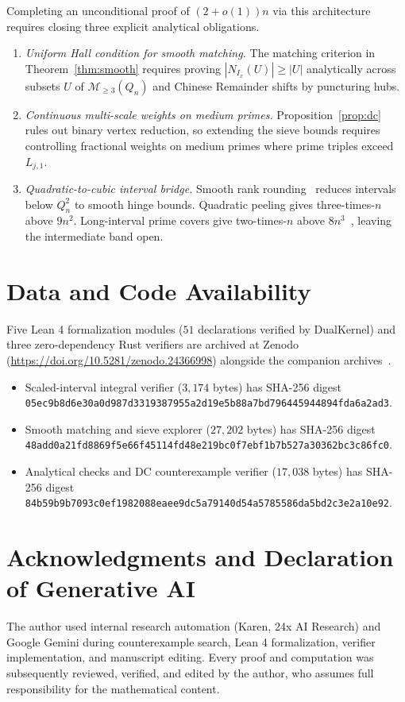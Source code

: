 \documentclass[11pt]{article}
\begin{document}
Completing an unconditional proof of $(2 + o(1)) n$ via this architecture requires closing three explicit analytical obligations.
\begin{enumerate}
\item \emph{Uniform Hall condition for smooth matching.} The matching criterion in Theorem~\ref{thm:smooth} requires proving $|N_{I_x}(U)| \ge |U|$ analytically across subsets $U$ of $\mathcal{M}_{\ge 3}(Q_n)$ and Chinese Remainder shifts by puncturing hubs.
\item \emph{Continuous multi-scale weights on medium primes.} Proposition~\ref{prop:dc} rules out binary vertex reduction, so extending the sieve bounds requires controlling fractional weights on medium primes where prime triples exceed $L_{j, 1}$.
\item \emph{Quadratic-to-cubic interval bridge.} Smooth rank rounding~\cite{bergstrom26asymptotic} reduces intervals below $Q_n^2$ to smooth hinge bounds. Quadratic peeling gives three-times-$n$ above $9n^2$. Long-interval prime covers give two-times-$n$ above $8n^3$~\cite{chen26}, leaving the intermediate band open.
\end{enumerate}

\section*{Data and Code Availability}

Five Lean 4 formalization modules ($51$ declarations verified by DualKernel) and three zero-dependency Rust verifiers are archived at Zenodo~\cite{bergstrom26smoothcode} (\url{https://doi.org/10.5281/zenodo.24366998}) alongside the companion archives~\cite{bergstrom26small,bergstrom26asymptotic}.
\begin{itemize}
\item Scaled-interval integral verifier ($3{,}174$ bytes) has SHA-256 digest {\small \texttt{05ec9b8d6e30a0d987d3319387955a2d19e5b88a7bd796445944894fda6a2ad3}}.
\item Smooth matching and sieve explorer ($27{,}202$ bytes) has SHA-256 digest {\small \texttt{48add0a21fd8869f5e66f45114fd48e219bc0f7ebf1b7b527a30362bc3c86fc0}}.
\item Analytical checks and DC counterexample verifier ($17{,}038$ bytes) has SHA-256 digest {\small \texttt{84b59b9b7093c0ef1982088eaee9dc5a79140d54a5785586da5bd2c3e2a10e92}}.
\end{itemize}

\section*{Acknowledgments and Declaration of Generative AI}

The author used internal research automation (Karen, 24x AI Research) and Google Gemini during counterexample search, Lean 4 formalization, verifier implementation, and manuscript editing. Every proof and computation was subsequently reviewed, verified, and edited by the author, who assumes full responsibility for the mathematical content.



\end{document}
